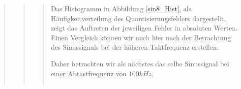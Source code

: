 \begin{quote}
\begin{quote}
\begin{quote}
            \vspace{1em}
            
            Das Histogramm in Abbildung \ref{sin8_Hist}, als
            Häufigkeitverteilung des Quantisierungsfehlers dargestellt, zeigt
            das Auftreten der jeweiligen Fehler in absoluten Werten. Einen
            Vergleich können wir auch hier nach der Betrachtung des Sinussignals
            bei der höheren Taktfrequenz erstellen.
            
            
            \vspace{1em}
            
            Daher betrachten wir als nächstes das selbe
            Sinussignal bei einer Abtastfrequenz von $100 kHz$.
    
            \begin{center}
                \begin{tabular}{ll}
                

\end{tabular}
\end{center}
\end{quote}
\end{quote}
\end{quote}
